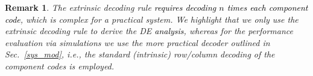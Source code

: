 \documentclass[journal]{IEEEtran}
\newtheorem{remark}{Remark}
\newcommand{\nc}{n}
\newcommand{\lc}{\boldsymbol{c}}
\newcommand{\lcp}{\boldsymbol{c'}}
\newcommand{\ham}{\mathsf{d}_\mathsf{H}}
\newcommand{\GL}{\textcolor{black}}
\newcommand{\AG}{\textcolor{black}}
\newcommand{\AGc}{\textcolor{black}}
\newcommand\scalemath[2]{\scalebox{#1}{\mbox{\ensuremath{\displaystyle #2}}}}   %
\begin{document}


\begin{remark}\label{rr0}
The extrinsic decoding rule \AG{requires decoding $n$ times each  component code}, which is  complex for a practical system. We highlight that we only use the extrinsic decoding rule to derive the DE \GL{analysis}, whereas for the performance evaluation via simulations we use the more practical decoder outlined in Sec.~\ref{sys_mod}, i.e., the standard (intrinsic) row/column decoding of the component codes is employed.  
\end{remark}
\end{document}
